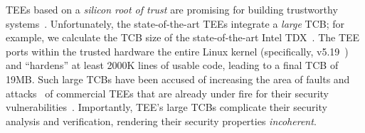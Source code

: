 

TEEs based on a {\em silicon root of trust} are promising for building trustworthy systems~\cite{avocado, minBFT, hybster, 10.1145/3492321.3519568}. Unfortunately, the state-of-the-art TEEs integrate a {\em large} TCB; for example, we calculate the TCB size of the state-of-the-art Intel TDX~\cite{intelTDX}. The TEE ports within the trusted hardware the entire Linux kernel (specifically, v5.19~\cite{linuxlifecircle}) and ``hardens'' at least 2000K lines of usable code, leading to a final TCB of 19MB. Such large TCBs have been accused of increasing the area of faults and attacks~\cite{10.1145/3379469, 10.5555/1756748.1756832} of commercial TEEs that are already under fire for their {security vulnerabilities}~\cite{intel_sgx_vulnerabilities1, intel_sgx_vulnerabilities2, intel_sgx_vulnerabilities3, intel_sgx_vulnerabilities4, intel_sgx_vulnerabilities5}. Importantly, TEE's large TCBs complicate their {security analysis and verification}, rendering their security properties {\em incoherent}. 



